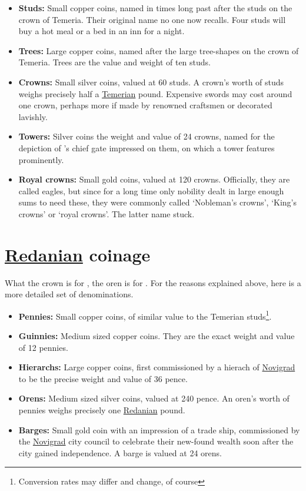 \documentclass[parskip=full,11pt,%
footheight=38pt]{scrreport}
\begin{document}
\begin{itemize}
	\item \textbf{Studs:} Small copper coins, named in times long past after the studs on the crown of Temeria.
	      Their original name no one now recalls. Four studs will buy a hot meal or a bed in an inn for a night.
	\item \textbf{Trees:} Large copper coins, named after the large tree-shapes on the crown of Temeria. Trees are
	      the value and weight of ten studs.
	\item \textbf{Crowns:} Small silver coins, valued at 60 studs. A crown's worth of studs weighs precisely half
	      a \hyperref[realm:temeria]{Temerian} pound. Expensive swords may cost around one crown, perhaps more if made by renowned craftsmen or decorated lavishly.
	\item \textbf{Towers:} Silver coins the weight and value of 24 crowns, named for the depiction of 's
	      chief gate impressed on them, on which a tower features prominently.
	\item \textbf{Royal crowns:} Small gold coins, valued at 120 crowns. Officially, they are called eagles, but since for
	      a long time only nobility dealt in large enough sums to need these, they were commonly called  `Nobleman's crowns',
	      `King's crowns' or `royal crowns'. The latter name stuck.
\end{itemize}

\section{\hyperref[realm:redania]{Redanian} coinage}
What the crown is for , the oren is for . For the reasons explained above,
here is a more detailed set of denominations.

\begin{itemize}
	\item \textbf{Pennies:} Small copper coins, of similar value to the Temerian studs\footnote{Conversion rates may differ and change, of course}.
	\item \textbf{Guinnies:} Medium sized copper coins. They are the exact weight and value of 12 pennies.
	\item \textbf{Hierarchs:} Large copper coins, first commissioned by a hierach of \hyperref[city:novigrad]{Novigrad} to
	      be the precise weight and value of 36 pence.
	\item \textbf{Orens:} Medium sized silver coins, valued at 240 pence. An oren's worth of pennies weighs precisely one
	      \hyperref[realm:redania]{Redanian} pound.
	\item \textbf{Barges:} Small gold coin with an impression of a trade ship, commissioned by the \hyperref[city:novigrad]{Novigrad}
	      city council to celebrate their new-found wealth soon after the city gained independence. A barge is valued at 24 orens.
\end{itemize}
\end{document}
